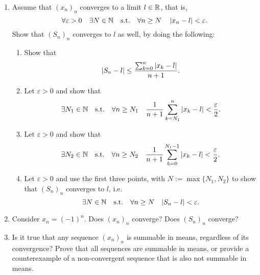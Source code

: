 \documentclass[12pt,a4paper]{article}
\newcommand{\Tailperso}[1]{%
\vfill	
\vskip2ex\noindent
\hrule
\vskip2ex\noindent
{\small
Informations générales, séries, voir \url{https://moodle.unige.ch/course/view.php?id=5641}}
\vskip2ex\noindent
\vskip2ex
}
\begin{document}
\begin{enumerate}
\item Assume that $(x_n)_n$ converges to a limit $l\in \mathbb{R}$, that is,
$$\forall \varepsilon>0 \quad \exists N\in\mathbb{N} \quad \text{s.t.} \quad  \forall n\geq N\quad \left\vert x_n-l\right\vert< \varepsilon.$$
Show that $(S_n)_n$ converges to $l$ as well, by doing the following:
	\begin{enumerate}
	
	\item Show that
	$$\left\vert S_n-l\right\vert\leq \frac{\sum_{k=0}^n \left\vert x_k-l\right\vert}{n+1}.$$
	\item Let $\varepsilon>0$ and show that
	$$\exists N_1\in\mathbb{N} \quad \text{s.t.} \quad \forall n\geq N_1 \quad \frac{1}{n+1} \sum_{k=N_1}^n \left\vert x_k-l\right\vert< \frac{\varepsilon}{2}.$$
	\item Let $\varepsilon>0$ and show that
	$$\exists N_2\in\mathbb{N}\quad \text{s.t.} \quad \forall n\geq N_2\quad \frac{1}{n+1} \sum_{k=0}^{N_1-1} \left\vert x_k-l\right\vert< \frac{\varepsilon}{2}.$$
	\item Let $\varepsilon>0$ and use the first three points, with $N:=\max\{N_1, N_2\}$ to show that $(S_n)_n$ converges to $l$, i.e.
	$$\exists N\in\mathbb{N} \quad \text{s.t.} \quad \forall n\geq N \quad |S_n-l|<\varepsilon.$$
	\end{enumerate}
\item Consider $x_n=(-1)^n$. Does $(x_n)_n$ converge? Does $(S_n)_n$ converge?
\item Is it true that any sequence $(x_n)_n$ is summable in means, regardless of its convergence? Prove that all sequences are summable in means, or provide a counterexample of a non-convergent sequence that is also not summable in means.
\end{enumerate}










 
\end{document}
